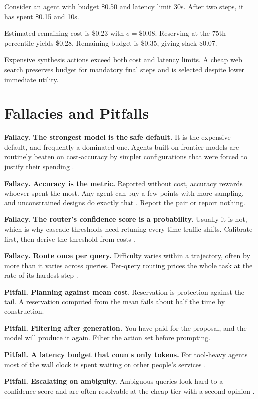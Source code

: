 Consider an agent with budget \$0.50 and latency limit 30s. After two steps, it has spent \$0.15 and 10s.

Estimated remaining cost is \$0.23 with $\sigma=\$0.08$. Reserving at the 75th percentile yields \$0.28. Remaining budget is \$0.35, giving slack \$0.07.

Expensive synthesis actions exceed both cost and latency limits. A cheap web search preserves budget for mandatory final steps and is selected despite lower immediate utility.

\section{Fallacies and Pitfalls}

\textbf{Fallacy. The strongest model is the safe default.} It is the expensive
default, and frequently a dominated one. Agents built on frontier models are
routinely beaten on cost-accuracy by simpler configurations that were forced to
justify their spending \cite{kapoor2024agents}.

\textbf{Fallacy. Accuracy is the metric.} Reported without cost, accuracy rewards
whoever spent the most. Any agent can buy a few points with more sampling, and
unconstrained designs do exactly that \cite{liu2025bats}. Report the pair or
report nothing.

\textbf{Fallacy. The router's confidence score is a probability.} Usually it is
not, which is why cascade thresholds need retuning every time traffic shifts.
Calibrate first, then derive the threshold from costs \cite{ucci2026}.

\textbf{Fallacy. Route once per query.} Difficulty varies within a trajectory,
often by more than it varies across queries. Per-query routing prices the whole
task at the rate of its hardest step \cite{policyrouting2026}.

\textbf{Pitfall. Planning against mean cost.} Reservation is protection against
the tail. A reservation computed from the mean fails about half the time by
construction.

\textbf{Pitfall. Filtering after generation.} You have paid for the proposal, and
the model will produce it again. Filter the action set before prompting.

\textbf{Pitfall. A latency budget that counts only tokens.} For tool-heavy agents
most of the wall clock is spent waiting on other people's services
\cite{timelymachine2026}.

\textbf{Pitfall. Escalating on ambiguity.} Ambiguous queries look hard to a
confidence score and are often resolvable at the cheap tier with a second opinion
\cite{cascadedebate2026}.

